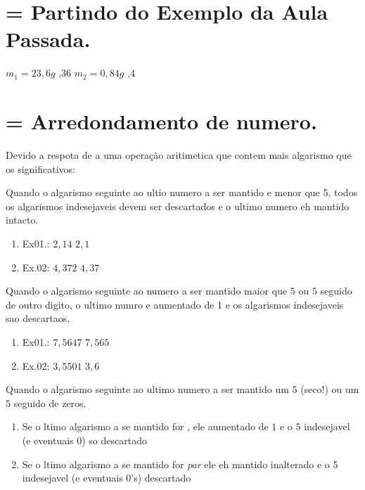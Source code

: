 \documentclass[a4paper,12pt]{article}
\begin{document}
\section{= Partindo do Exemplo da Aula Passada.}
$m_1 = 23,6g$ ,36
$m_2 = 0,84g$ ,4

\section{= Arredondamento de numero.}
Devido a respota de a uma operação aritimetica que contem mais algarismo que os significativos:
\begin{itemsize}
\item Quando o algarismo seguinte ao ultio numero a ser mantido e menor que 5, todos os algarismos indesejaveis devem ser descartados e o ultimo numero eh mantido intacto. 
  \begin{enumerate}
    \item Ex01.: $2,14$ \longrightarrow $2,1$
    \item Ex.02: $4,372$ \longrightarrow $4,37$
  \end{enumerate}
\item Quando o algarismo seguinte ao numero a ser mantido  maior que $5$ ou $5$ seguido de outro digito, o ultimo numro e aumentado de 1 e os algarismos indesejaveis sao descartaos.
  \begin{enumerate}
    \item Ex01.: $7,5647$ \longrightarrow $7,565$
    \item Ex.02: $3,5501$ \longrightarrow $3,6$
  \end{enumerate}
\item Quando o algarismo seguinte ao ultimo numero a ser mantido  um $5$ (seco!) ou um $5$ seguido de zeros.
  \begin{enumerate}
    \item Se o ltimo algarismo a se mantido for , ele  aumentado de $1$ e o $5$ indesejavel (e eventuais $0$) so descartado
    \item Se o ltimo algarismo a se mantido for \textit{par} ele eh mantido inalterado e o 5 indesejavel (e eventuais 0's)  descartado
  \end{enumerate}
\end{itemsize}
\end{document}
